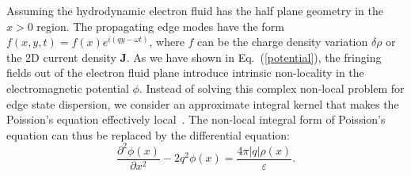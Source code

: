 \documentclass[%
reprint,
amsmath,amssymb,
aps,superscriptaddress
]{revtex4-2}
\begin{document}
Assuming the hydrodynamic electron fluid has the half plane geometry in the $x>0$ region. The propagating edge modes have the form $f(x,y,t)=f(x)e^{i(qy-\omega t)}$, where $f$ can be the charge density variation $\delta \rho$ or the 2D current density $\mathbf{J}$. As we have shown in Eq.~(\ref{potential}), the fringing fields out of the electron fluid plane introduce intrinsic non-locality in the electromagnetic potential $\phi$. Instead of solving this complex non-local problem for edge state dispersion, we consider an approximate integral kernel that makes the Poission's equation effectively local~\cite{fetter1985edge}. The non-local integral form of Poission's equation can thus be replaced by the differential equation:
\begin{equation}\label{fetter}
    \frac{\partial^2 \phi(x)}{\partial x^2} - 2q^2 \phi(x) = \frac{4\pi |q| \rho(x)}{\varepsilon}.
\end{equation}
\end{document}
